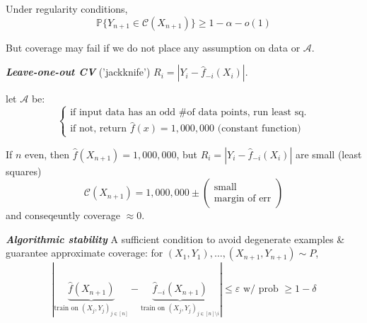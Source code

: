 Under regularity conditions,
\[ \mathbb{P}\{Y_{n+1} \in \mathcal{C}(X_{n+1})\} \ge 1 - \alpha - o(1) \]

But coverage may fail if we do not place any assumption on data or $\mathcal{A}$.

\emph{\textbf{Leave-one-out CV}} ('jackknife') $R_i = |Y_i-\hat{f}_{-i}(X_i)|$.

\begin{example}
    

let $\mathcal{A}$ be:
\[ \begin{cases} 
\text{if input data has an odd \# of data points, run least sq.} \\ 
\text{if not, return } \hat{f}(x) = 1,000,000 \text{ (constant function)} 
\end{cases} \]

If $n$ even, then $\hat{f}(X_{n+1}) = 1,000,000$, 
but $R_i = |Y_i - \hat{f}_{-i}(X_i)|$ are small (least squares)
\[ \mathcal{C}(X_{n+1}) = 1,000,000 \pm \left( \substack{\text{small} \\ \text{margin of err}} \right) \]
and conseqeuntly coverage $\approx 0$.


\end{example}

\emph{\textbf{Algorithmic stability}}
A sufficient condition to avoid degenerate examples \& guarantee approximate coverage: for $(X_1, Y_1), \dots, (X_{n+1}, Y_{n+1}) \sim P$,
\[ |\underbrace{\hat{f}(X_{n+1})}_{\text{train on }(X_j, Y_j)_{j \in [n]}} - \underbrace{\hat{f}_{-i}(X_{n+1})}_{\text{train on }(X_j, Y_j)_{j \in [n] \setminus i}}| \le \varepsilon \text{ w/ prob } \ge 1-\delta \]
